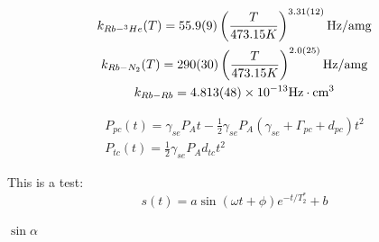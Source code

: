 \documentclass[pdftex,letterpaper,12pt]{report}
\begin{document}
	
\begin{subequations}
	\begin{gather}
	k_{Rb-^{3}He}(T)=55.9(9)\left(\frac{T}{473.15K}\right)^{3.31(12)} {\rm Hz/amg}\\
	k_{Rb-N_{2}}(T)=290(30)\left(\frac{T}{473.15K}\right)^{2.0(25)}{\rm Hz/amg}\\
	k_{Rb-Rb}=4.813(48)\times 10^{-13} {\rm Hz\cdot cm^{3}}
	\end{gather}
\end{subequations}

\begin{subequations}\label{InitialSpinup}
	\begin{gather}
	P_{pc}(t)=\gamma_{se}P_{A}t-\frac{1}{2}\gamma_{se}P_{A}(\gamma_{se}+\Gamma_{pc}+d_{pc})t^{2}\\
	P_{tc}(t)=\frac{1}{2}\gamma_{se}P_{A}d_{tc}t^{2}
	\end{gather}
\end{subequations}

This is a test:
\begin{equation}
s(t)=a\sin(\omega t+\phi)e^{-t/T_{2}^{*}}+b
\end{equation}

$\sin \alpha$
\end{document}
